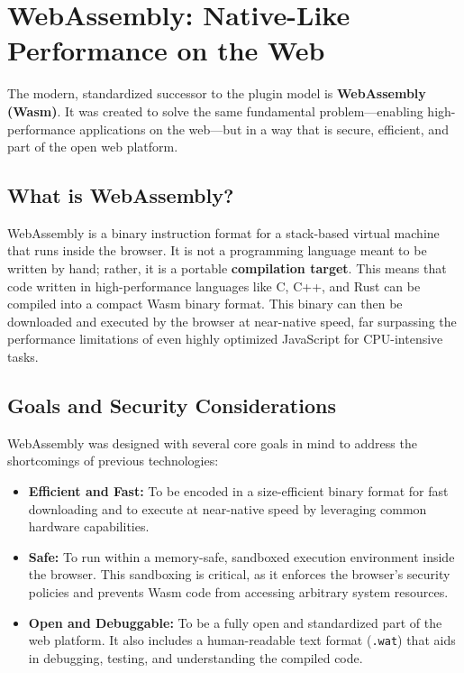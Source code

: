 \documentclass{scrbook}
\begin{document}
\section{WebAssembly: Native-Like Performance on the Web}

The modern, standardized successor to the plugin model is \textbf{WebAssembly (Wasm)}. It was created to solve the same fundamental problem—enabling high-performance applications on the web—but in a way that is secure, efficient, and part of the open web platform.

\subsection{What is WebAssembly?}

WebAssembly is a binary instruction format for a stack-based virtual machine that runs inside the browser. It is not a programming language meant to be written by hand; rather, it is a portable \textbf{compilation target}. This means that code written in high-performance languages like C, C++, and Rust can be compiled into a compact Wasm binary format. This binary can then be downloaded and executed by the browser at near-native speed, far surpassing the performance limitations of even highly optimized JavaScript for CPU-intensive tasks.

\subsection{Goals and Security Considerations}

WebAssembly was designed with several core goals in mind to address the shortcomings of previous technologies:

\begin{itemize}
    \item \textbf{Efficient and Fast:} To be encoded in a size-efficient binary format for fast downloading and to execute at near-native speed by leveraging common hardware capabilities.
    \item \textbf{Safe:} To run within a memory-safe, sandboxed execution environment inside the browser. This sandboxing is critical, as it enforces the browser's security policies and prevents Wasm code from accessing arbitrary system resources.
    \item \textbf{Open and Debuggable:} To be a fully open and standardized part of the web platform. It also includes a human-readable text format (\texttt{.wat}) that aids in debugging, testing, and understanding the compiled code.
\end{itemize}
\end{document}
